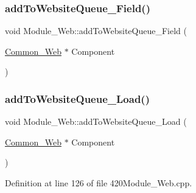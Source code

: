 \subsubsection{\texorpdfstring{add\+To\+Website\+Queue\+\_\+\+Field()}{addToWebsiteQueue\_Field()}\hspace{0.1cm}{\footnotesize\ttfamily [2/2]}}
{\footnotesize\ttfamily void Module\+\_\+\+Web\+::add\+To\+Website\+Queue\+\_\+\+Field (\begin{DoxyParamCaption}\item[{\hyperlink{class_common___web}{Common\+\_\+\+Web} $\ast$}]{Component }\end{DoxyParamCaption})}

\mbox{\label{class_module___web_a11f84c9609ed88d1bfcd869d64775e93}} 
\subsubsection{\texorpdfstring{add\+To\+Website\+Queue\+\_\+\+Load()}{addToWebsiteQueue\_Load()}\hspace{0.1cm}{\footnotesize\ttfamily [1/2]}}
{\footnotesize\ttfamily void Module\+\_\+\+Web\+::add\+To\+Website\+Queue\+\_\+\+Load (\begin{DoxyParamCaption}\item[{\hyperlink{class_common___web}{Common\+\_\+\+Web} $\ast$}]{Component }\end{DoxyParamCaption})}



Definition at line 126 of file 420\+Module\+\_\+\+Web.\+cpp.

